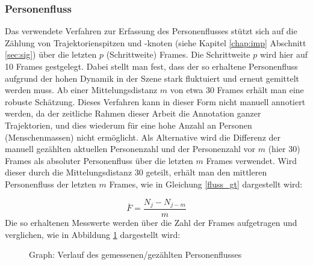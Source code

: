 \subsubsection{Personenfluss}
\label{dispersion_fluss}
Das verwendete Verfahren zur Erfassung des Personenflusses stützt sich auf die Zählung von Trajektorienspitzen und -knoten (siehe Kapitel \ref{chap:imp} Abschnitt \ref{sec:sig}) über die letzten $p$ (Schrittweite) Frames. Die Schrittweite $p$ wird hier auf 10 Frames gestgelegt. Dabei stellt man fest, dass der so erhaltene Personenfluss aufgrund der hohen Dynamik in der Szene stark fluktuiert und erneut gemittelt werden muss. Ab einer Mittelungsdistanz $m$ von etwa 30 Frames erhält man eine robuste Schätzung. Dieses Verfahren kann in dieser Form nicht manuell annotiert werden, da der zeitliche Rahmen dieser Arbeit die Annotation ganzer Trajektorien, und dies wiederum für eine hohe Anzahl an Personen (Menschenmassen) nicht ermöglicht.
\newpage
Als Alternative wird die Differenz der manuell gezählten aktuellen Personenzahl und der Personenzahl vor $m$ (hier 30) Frames als absoluter Personenfluss über die letzten $m$ Frames verwendet. Wird dieser durch die Mittelungsdistanz 30 geteilt, erhält man den mittleren Personenfluss der letzten $m$ Frames, wie in Gleichung \ref{fluss_gt} dargestellt wird:

\begin{equation}
    \bar{F}=\frac{N_j-N_{j-m}}{m}
    \label{fluss_gt}
\end{equation}
\vskip 5pt
 Die so erhaltenen Messwerte werden über die Zahl der Frames aufgetragen und verglichen, wie in Abbildung \ref{fluss} dargestellt wird:
\vskip 10pt
\begin{figure}[h]
  \centering
  \caption{Graph: Verlauf des gemessenen/gezählten Personenflusses \cite{CourtyPRL2014} \cite{Allain2012ICPR}}
  \label{fluss}
\end{figure}

